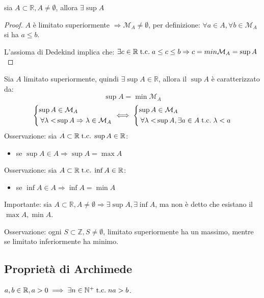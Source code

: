 \documentclass[a4paper,12pt]{article}
\begin{document}
	\begin{proposition}
		sia $A \subset \mathbb{R}, A \not = \emptyset$, allora $\exists \sup A$
	\end{proposition}
	
	\begin{proof}
		$A $ è limitato superiormente $\Rightarrow \mathcal{M}_A \not = \emptyset$, per definizione: $\forall a \in A,\forall b \in \mathcal{M}_A$ si ha $a \leq b$.
		
		L'assioma di Dedekind implica che: $\exists c \in \mathbb{R} \;\text{t.c.}\; a \leq c \leq b \Rightarrow c = min \mathcal{M}_A = \sup A$
	\end{proof}
	
	Sia $A$ limitato superiormente, quindi $\exists \sup A \in \mathbb{R}$, allora il $\sup A$ è caratterizzato da:
	\[\sup A = \min \mathcal{M}_A\]
	\[
	\left\{
	\begin{aligned}
		\sup A &\in \mathcal{M}_A \\
		\forall \lambda < &\sup A \Rightarrow \lambda\in \mathcal{M}_A
	\end{aligned}
	\right. \iff \left\{
	\begin{aligned}
	\sup A &\in \mathcal{M}_A \\
	\forall \lambda < &\sup A, \exists a \in A \;\text{t.c.}\; \lambda < a
	\end{aligned}\right.
	\]
	Osservazione:
	sia $A \subset \mathbb{R} \;\text{t.c.}\; \sup A \in \mathbb{R}$:
	\begin{itemize}
		\item se $\sup A \in A \Rightarrow \sup A = \max A$
	\end{itemize}
	Osservazione: sia $A \subset \mathbb{R} \;\text{t.c.}\; \inf A \in \mathbb{R}$:
	\begin{itemize}
	\item se $\inf A \in A \Rightarrow \inf A = \min A$
	\end{itemize}	
	Importante:
	sia $A \subset \mathbb{R}, A \not = \emptyset \Rightarrow \exists \sup A, \exists \inf A $, ma non è detto che esistano il $\max A, \min A$.
	
	Osservazione:
	ogni $S \subset \mathbb{Z}, S \not = \emptyset$, limitato superiormente ha un massimo, mentre se limitato inferiormente ha minimo.
	
	\subsection{Proprietà di Archimede}
	$a, b \in \mathbb{R}, a > 0 \implies \exists n \in \mathbb{N}^+ \;\text{t.c.}\; na > b$.
	
\end{document}

